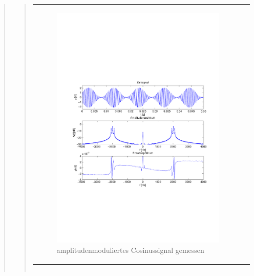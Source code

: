 \begin{quote}
\begin{quote}
\begin{center}
\begin{tabular}{ll}
\begin{minipage}{0.6\textwidth}
                     \begin{figure}[H]
                        \label{fig:}
                        \includegraphics[scale=0.5, trim = 2cm 6.5cm 1.5cm
                        8.5cm, clip]{./Bilder/Cosinusmodgemessen} %
                        \caption{amplitudenmoduliertes Cosinussignal gemessen}
                    \end{figure}
               \vspace{-1.5em}

                \end{minipage}

            \end{tabular}
            \end{center}
            
                    \begin{center}
            \begin{tabular}{ll}


\end{tabular}
\end{center}
\end{quote}
\end{quote}
